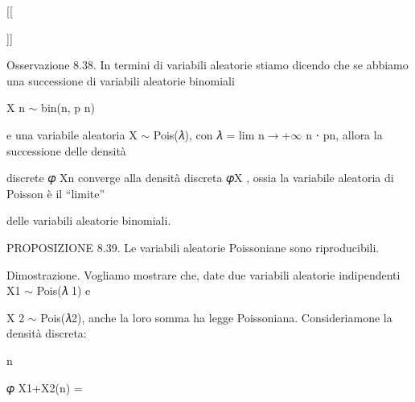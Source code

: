 \documentclass[a4paper,portrait,12pt]{article}
\begin{document}
[[





]]





\begin{flushleft}
Osservazione 8.38. In termini di variabili aleatorie stiamo dicendo che se abbiamo una successione di variabili aleatorie binomiali
\end{flushleft}


\begin{flushleft}
X n $\sim$ bin(n, p n)
\end{flushleft}


\begin{flushleft}
e una variabile aleatoria X $\sim$ Pois(𝜆), con 𝜆 = lim n$\rightarrow$+$\infty$ n ⋅ pn, allora la successione delle densit\`{a}
\end{flushleft}


\begin{flushleft}
discrete 𝜑 Xn converge alla densit\`{a} discreta 𝜑X , ossia la variabile aleatoria di Poisson \`{e} il {``}limite''
\end{flushleft}


\begin{flushleft}
delle variabili aleatorie binomiali.
\end{flushleft}


\begin{flushleft}
PROPOSIZIONE 8.39. Le variabili aleatorie Poissoniane sono riproducibili.
\end{flushleft}


\begin{flushleft}
Dimostrazione. Vogliamo mostrare che, date due variabili aleatorie indipendenti X1 $\sim$ Pois(𝜆 1) e
\end{flushleft}


\begin{flushleft}
X 2 $\sim$ Pois(𝜆2), anche la loro somma ha legge Poissoniana. Consideriamone la densit\`{a} discreta:
\end{flushleft}


\begin{flushleft}
n
\end{flushleft}





\begin{flushleft}
𝜑 X1+X2(n) =
\end{flushleft}
\end{document}
